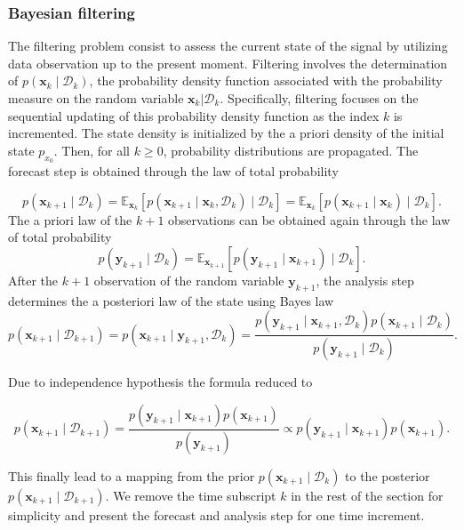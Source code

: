 \subsubsection{Bayesian filtering}

The filtering problem consist to assess the current state of the signal by utilizing data observation up to the present moment. Filtering involves the determination of $p(\bm x_{k} \mid \mathcal{D}_{k})$, the probability density function associated with the probability measure on the random variable $\bm x_{k} | \mathcal D_{k}$. Specifically, filtering focuses on the sequential updating of this probability density function as the index $k$ is incremented.
The state density is initialized by the a priori density of the initial state $p_{x_0}$.
Then, for all $k \geq 0$, probability distributions are propagated.
The forecast step is obtained through the law of total probability

\begin{equation*}
    p(\bm x_{k+1} \mid \mathcal D_k) = \mathbb{E}_{\bm x_k}\left[p(\bm x_{k+1} \mid  \bm x_k,\mathcal{D}_k) \mid \mathcal D_k \right] = \mathbb{E}_{\bm x_k}\left[p(\bm x_{k+1} \mid \bm x_k) \mid \mathcal D_k \right].
\end{equation*}
The a priori law of the $k+1$ observations can be obtained again through the law of total probability
\begin{equation*}
    p(\bm y_{k+1} \mid \mathcal D_k) = \mathbb{E}_{\bm{x}_{k+1}}\left[p(\bm y_{k+1}\mid \bm x_{k+1}) \mid \mathcal D_k\right].
\end{equation*}
After the $k+1$ observation of the random variable $\bm y_{k+1}$, the analysis step determines the a posteriori law of the state using Bayes law
\begin{equation*}
    p(\bm x_{k+1} \mid \mathcal D_{k+1}) = p(\bm x_{k+1} \mid \bm y_{k+1}, \mathcal D_{k})  = \frac{p(\bm y_{k+1} \mid \bm x_{k+1} ,\mathcal D_k)  p(\bm x_{k+1}\mid \mathcal D_k)}{p(\bm y_{k+1}\mid \mathcal D_k)}.
\end{equation*}

Due to independence hypothesis the formula reduced to

\begin{equation*}
    p(\bm x_{k+1} \mid \mathcal D_{k+1}) = \frac{p(\bm y_{k+1} \mid \bm x_{k+1})  p(\bm x_{k+1})}{p(\bm y_{k+1})} \propto p(\bm y_{k+1} \mid \bm x_{k+1})  p(\bm x_{k+1}).
\end{equation*}

This finally lead to a mapping from the prior $p(\bm x_{k+1} \mid \mathcal D_k)$ to the posterior $p(\bm x_{k+1} \mid \mathcal D_{k+1})$.
We remove the time subscript $k$ in the rest of the section for simplicity and present the forecast and analysis step for one time increment.

